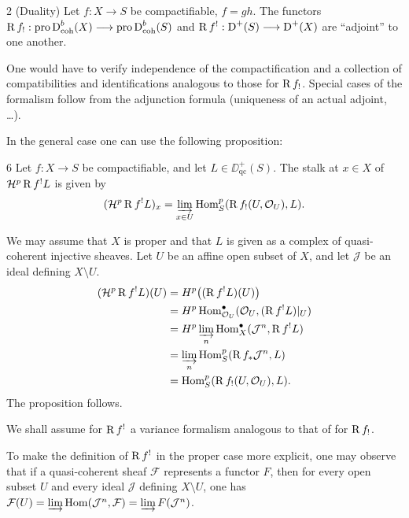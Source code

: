 \begin{booktheorem}{2}\label{appen:thm2}
(Duality) Let $f:X\longrightarrow S$ be compactifiable, $f=gh$. The functors $\operatorname{R} f_!:\operatorname{pro}\operatorname{D}_{\operatorname{coh}}^b(X)\longrightarrow\operatorname{pro}\operatorname{D}_{\operatorname{coh}}^b(S)$ and $\operatorname{R} f^!:\operatorname{D}^+(S)\longrightarrow\operatorname{D}^+(X)$ are ``adjoint'' to one another.
\end{booktheorem}

One would have to verify independence of the compactification and a collection of compatibilities and identifications analogous to those for $\operatorname{R} f_!$. Special cases of the formalism follow from the adjunction formula (uniqueness of an actual adjoint, \dots).

In the general case one can use the following proposition:

\begin{bookproposition}{6}\label{appen:prop6}
Let $f:X\longrightarrow S$ be compactifiable, and let $L\in\DD_{\operatorname{qc}}^+(S)$. The stalk at $x\in X$ of $\mathcal H^p\operatorname{R} f^!L$ is given by
\[
(\mathcal{H}^{p}\operatorname{R} f^{!}L)_{x} = \varinjlim_{x \in U} \operatorname{Hom}_{S}^{p}(\operatorname{R} f_{!}(U,\mathcal{O}_{U}), L).
\]
\end{bookproposition}

We may assume that $X$ is proper and that $L$ is given as a complex of quasi-coherent injective sheaves. Let $U$ be an affine open subset of $X$, and let $\mathcal J$ be an ideal defining $X\setminus U$.
\begin{align*}
(\mathcal{H}^{p}\operatorname{R} f^{!}L)(U)
 &= H^{p}\bigl((\operatorname{R} f^{!}L)(U)\bigr) \\
 &= H^{p}\operatorname{Hom}_{\mathcal{O}_{U}}^{\bullet}
       (\mathcal{O}_{U},(\operatorname{R} f^{!}L)|_{U}) \\
 &= H^{p}\varinjlim_{n}\operatorname{Hom}_{X}^{\bullet}
       (\mathcal{J}^{n},\operatorname{R} f^{!}L) \\
 &= \varinjlim_{n}\operatorname{Hom}_{S}^{p}(\operatorname{R} f_{*}\mathcal{J}^{n},L) \\
 &= \operatorname{Hom}_{S}^{p}(\operatorname{R} f_{!}(U,\mathcal{O}_{U}),L).
\end{align*}
The proposition follows.

We shall assume for $\operatorname{R} f^!$ a variance formalism analogous to that of  for $\operatorname{R} f_!$.

To make the definition of $\operatorname{R} f^!$ in the proper case more explicit, one may observe that if a quasi-coherent sheaf $\mathcal F$ represents a functor $F$, then for every open subset $U$ and every ideal $\mathcal J$ defining $X\setminus U$, one has $\mathcal F(U)=\varinjlim\operatorname{Hom}(\mathcal J^n,\mathcal F)=\varinjlim F(\mathcal J^n)$.

